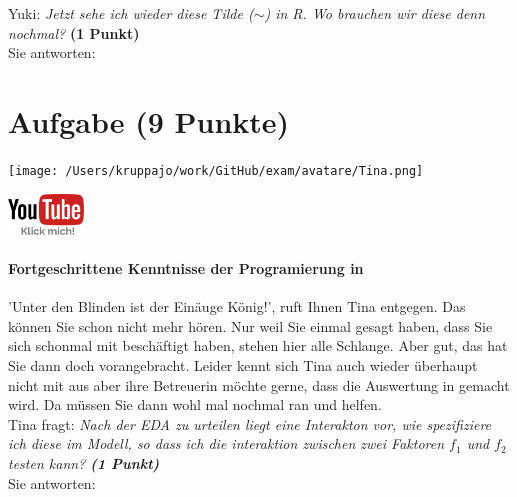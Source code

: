 \documentclass[a4paper, 9pt]{scrartcl}\usepackage[]{graphicx}\usepackage[]{xcolor}
\begin{document}
Yuki: \textit{Jetzt sehe ich wieder diese Tilde ($\sim$) in R. Wo brauchen wir diese denn nochmal?} \textbf{(1 Punkt)}\\[1ex]
Sie antworten:\\[2Ex] 
\clearpage

\section{Aufgabe \hfill (9 Punkte)}



 
\begin{minipage}[t]{0.5\textwidth}
\texttt{[image: /Users/kruppajo/work/GitHub/exam/avatare/Tina.png]}
\end{minipage}
\begin{minipage}[t]{0.5\textwidth}
\hfill
\href{https://www.youtube.com/playlist?list=PLe51bCp9JvEFUnFqaJG5aRmON9i1ZbOYC}{\includegraphics[width = 2cm]{img/youtube}}
\end{minipage}
\vspace{1ex}



\paragraph{Fortgeschrittene Kenntnisse der Programierung in \Rlogo}

'Unter den Blinden ist der Einäuge König!', ruft Ihnen Tina entgegen. Das können Sie schon nicht mehr hören. Nur weil Sie einmal gesagt haben, dass Sie sich schonmal mit \Rlogo beschäftigt haben, stehen hier alle Schlange. Aber gut, das hat Sie dann doch vorangebracht. Leider kennt sich Tina auch wieder überhaupt nicht mit \Rlogo aus aber ihre Betreuerin möchte gerne, dass die Auswertung in \Rlogo gemacht wird. Da müssen Sie dann wohl mal nochmal ran und helfen.\\[1Ex]

Tina fragt: \textit{Nach der EDA zu urteilen liegt eine Interakton vor, wie spezifiziere ich diese im Modell, so dass ich die interaktion zwischen zwei Faktoren $f_1$ und $f_2$ testen kann? \textbf{(1 Punkt)}}\\[1ex]
Sie antworten:\\[2Ex]
\end{document}
